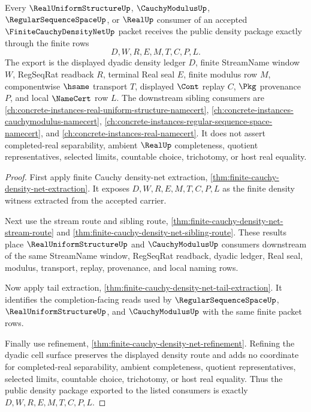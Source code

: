 \begin{theorem}
\label{thm:finite-cauchy-density-net-public-density-export}
Every $\RealUniformStructureUp$, $\CauchyModulusUp$, $\RegularSequenceSpaceUp$, or $\RealUp$ consumer of an accepted $\FiniteCauchyDensityNetUp$ packet receives the public density package exactly through the finite rows
$$
D,W,R,E,M,T,C,P,L .
$$
The export is the displayed dyadic density ledger $D$, finite StreamName window $W$, RegSeqRat readback $R$, terminal Real seal $E$, finite modulus row $M$, componentwise $\hsame$ transport $T$, displayed $\Cont$ replay $C$, $\Pkg$ provenance $P$, and local $\NameCert$ row $L$. The downstream sibling consumers are \autoref{ch:concrete-instances-real-uniform-structure-namecert}, \autoref{ch:concrete-instances-cauchymodulus-namecert}, \autoref{ch:concrete-instances-regular-sequence-space-namecert}, and \autoref{ch:concrete-instances-real-namecert}. It does not assert completed-real separability, ambient $\RealUp$ completeness, quotient representatives, selected limits, countable choice, trichotomy, or host real equality.
\end{theorem}
\begin{proof}
First apply finite Cauchy density-net extraction, \autoref{thm:finite-cauchy-density-net-extraction}. It exposes $D,W,R,E,M,T,C,P,L$ as the finite density witness extracted from the accepted carrier.

Next use the stream route and sibling route, \autoref{thm:finite-cauchy-density-net-stream-route} and \autoref{thm:finite-cauchy-density-net-sibling-route}. These results place $\RealUniformStructureUp$ and $\CauchyModulusUp$ consumers downstream of the same StreamName window, RegSeqRat readback, dyadic ledger, Real seal, modulus, transport, replay, provenance, and local naming rows.

Now apply tail extraction, \autoref{thm:finite-cauchy-density-net-tail-extraction}. It identifies the completion-facing reads used by $\RegularSequenceSpaceUp$, $\RealUniformStructureUp$, and $\CauchyModulusUp$ with the same finite packet rows.

Finally use refinement, \autoref{thm:finite-cauchy-density-net-refinement}. Refining the dyadic cell surface preserves the displayed density route and adds no coordinate for completed-real separability, ambient completeness, quotient representatives, selected limits, countable choice, trichotomy, or host real equality. Thus the public density package exported to the listed consumers is exactly $D,W,R,E,M,T,C,P,L$.
\end{proof}
